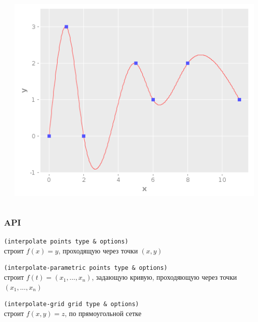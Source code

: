 \documentclass[russian]{beamer}
\begin{document}
\begin{frame}
\begin{columns}[c]
\begin{column}{.35\textwidth}
    \end{column}
    \begin{column}{.35\textwidth}
      \includegraphics[width=\textwidth,height=\textheight,keepaspectratio]{cubic_interpolation_1_var_small}
    \end{column}
  \end{columns}
\end{frame}

\begin{frame}[fragile]
  \frametitle{API}
  \verb+(interpolate points type & options)+ \\
  строит $f(x) = y$, проходящую через точки $(x, y)$ \\

  \vspace{1.2cm}

  \verb+(interpolate-parametric points type & options)+ \\
  строит $f(t) = (x_1, ..., x_n)$, задающую кривую, проходяющую через точки $(x_1, ..., x_n)$ \\

  \vspace{1.2cm}

  \verb+(interpolate-grid grid type & options)+ \\
  строит $f(x, y) = z$, по прямоугольной сетке
\end{frame}
\end{document}
